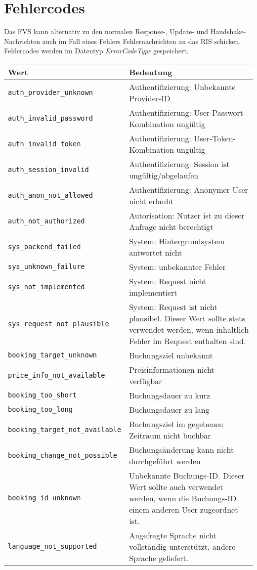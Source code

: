 \section{Fehlercodes}
\label{sec:CodeTabellen:ErrorCode}
Das FVS kann alternativ zu den normalen Response-, Update- und Handshake-Nachrichten auch im Fall eines Fehlers Fehlernachrichten an das RIS schicken. Fehlercodes werden im Datentyp \emph{ErrorCodeType} gespeichert.
\begin{flushleft}
\begin{tabularx}{\linewidth}{l>{\raggedright\arraybackslash}X} 
\toprule
Wert & Bedeutung\\
\midrule
\verb|auth_provider_unknown| & Authentifizierung: Unbekannte Provider-ID\\
\verb|auth_invalid_password| & Authentifizierung: User-Passwort-Kombination ungültig\\
\verb|auth_invalid_token| & Authentifizierung: User-Token-Kombination ungültig\\
\verb|auth_session_invalid| & Authentifizierung: Session ist ungültig/abgelaufen\\
\verb|auth_anon_not_allowed| & Authentifizierung: Anonymer User nicht erlaubt\\
\verb|auth_not_authorized| & Autorisation: Nutzer ist zu dieser Anfrage nicht berechtigt\\
\verb|sys_backend_failed| & System: Hintergrundsystem antwortet nicht\\
\verb|sys_unknown_failure| & System: unbekannter Fehler\\
\verb|sys_not_implemented| & System: Request nicht implementiert\\
\verb|sys_request_not_plausible| & System: Request ist nicht plausibel. Dieser Wert sollte stets verwendet werden, wenn inhaltlich Fehler im Request enthalten sind.\\
\verb|booking_target_unknown| & Buchungsziel unbekannt\\
\verb|price_info_not_available| & Preisinformationen nicht verfügbar\\
\verb|booking_too_short| & Buchungsdauer zu kurz\\
\verb|booking_too_long| & Buchungsdauer zu lang\\
\verb|booking_target_not_available| & Buchungsziel im gegebenen Zeitraum nicht buchbar\\
\verb|booking_change_not_possible| & Buchungsänderung kann nicht durchgeführt werden\\
\verb|booking_id_unknown| & Unbekannte Buchungs-ID. Dieser Wert sollte auch verwendet werden, wenn die Buchungs-ID einem anderen User zugeordnet ist.\\
\verb|language_not_supported| & Angefragte Sprache nicht vollständig unterstützt, andere Sprache geliefert.\\
\bottomrule
\end{tabularx}
\end{flushleft}